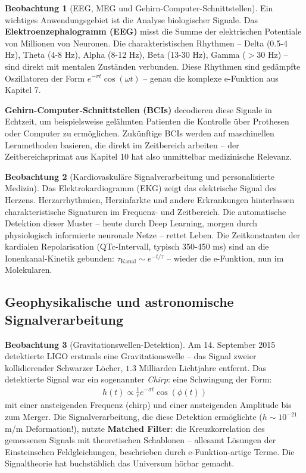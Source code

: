 ﻿\documentclass[a4paper,12pt]{report}
\theoremstyle{definition}
\newtheorem{beobachtung}{Beobachtung}
\begin{document}
	\begin{beobachtung}[EEG, MEG und Gehirn-Computer-Schnittstellen]
		Ein wichtiges Anwendungsgebiet ist die Analyse biologischer Signale. Das \textbf{Elektroenzephalogramm (EEG)} misst die Summe der elektrischen Potentiale von Millionen von Neuronen. Die charakteristischen Rhythmen -- Delta (0.5-4 Hz), Theta (4-8 Hz), Alpha (8-12 Hz), Beta (13-30 Hz), Gamma ($> 30$ Hz) -- sind direkt mit mentalen Zuständen verbunden. Diese Rhythmen sind gedämpfte Oszillatoren der Form $e^{-\sigma t} \cos(\omega t)$ -- genau die komplexe e-Funktion aus Kapitel 7.
		
		\textbf{Gehirn-Computer-Schnittstellen (BCIs)} decodieren diese Signale in Echtzeit, um beispielsweise gelähmten Patienten die Kontrolle über Prothesen oder Computer zu ermöglichen. Zukünftige BCIs werden auf maschinellen Lernmethoden basieren, die direkt im Zeitbereich arbeiten -- der Zeitbereichsprimat aus Kapitel 10 hat also unmittelbar medizinische Relevanz.
	\end{beobachtung}
	
	\begin{beobachtung}[Kardiovaskuläre Signalverarbeitung und personalisierte Medizin]
		Das Elektrokardiogramm (EKG) zeigt das elektri\-sche Signal des Herzens. Herzarrhythmien, Herzinfarkte und andere Erkrankungen hinterlassen charakteristische Signaturen im Frequenz- und Zeitbereich. Die automatische Detektion dieser Muster -- heute durch Deep Learning, morgen durch physiologisch informierte neuronale Netze -- rettet Leben. Die Zeitkonstanten der kardialen Repolarisation (QTc-Intervall, typisch 350-450 ms) sind an die Ionenkanal-Kinetik gebunden: $\tau_{\text{Kanal}} \sim e^{-t/\tau}$ -- wieder die e-Funktion, nun im Molekularen.
	\end{beobachtung}
	
	\subsection{Geophysikalische und astronomische Signalverarbeitung}
	
	\begin{beobachtung}[Gravitationswellen-Detektion]
		Am 14. September 2015 detektierte LIGO erstmals eine Gravitationswelle -- das Signal zweier kollidierender Schwarzer Löcher, $1.3$ Milliarden Lichtjahre entfernt. Das detektierte Signal war ein sogenannter \emph{Chirp}: eine Schwingung der Form:
		\begin{align}
			h(t) \propto \frac{1}{r} e^{-\sigma t} \cos(\phi(t))
		\end{align}
		mit einer ansteigenden Frequenz (chirp) und einer ansteigenden Amplitude bis zum Merger. Die Signalverarbeitung, die diese Detektion ermöglichte ($h \sim 10^{-21}$ m/m Deformation!), nutzte \textbf{Matched Filter}: die Kreuzkorrelation des gemessenen Signals mit theoretischen Schablonen -- allesamt Lösungen der Einsteinschen Feldgleichungen, beschrieben durch e-Funktion-artige Terme. Die Signaltheorie hat buchstäblich das Universum hörbar gemacht.
	\end{beobachtung}
	
\end{document}
